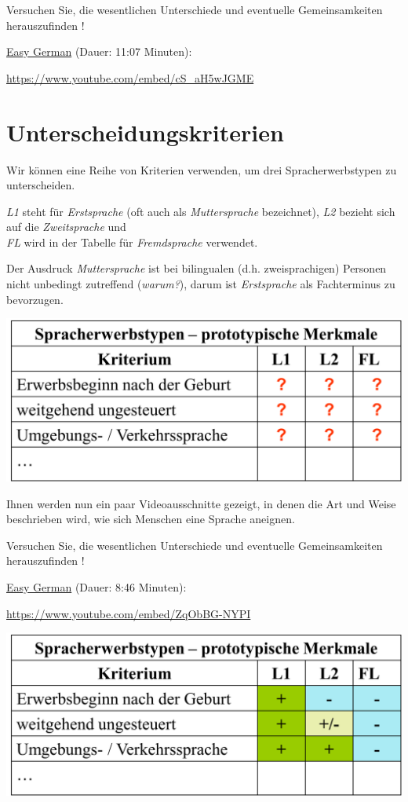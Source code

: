 \documentclass[
  letterpaper,
]{scrbook}
\begin{document}
Versuchen Sie, die wesentlichen Unterschiede und eventuelle
Gemeinsamkeiten herauszufinden !

\href{https://www.youtube.com/watch?v=cS_aH5wJGME}{Easy German} (Dauer:
11:07 Minuten):

\url{https://www.youtube.com/embed/cS_aH5wJGME}

\hypertarget{unterscheidungskriterien}{%
\section{Unterscheidungskriterien}\label{unterscheidungskriterien}}

Wir können eine Reihe von Kriterien verwenden, um drei
Spracherwerbstypen zu unterscheiden.

\emph{L1} steht für \emph{Erstsprache} (oft auch als
\emph{Muttersprache} bezeichnet), \emph{L2} bezieht sich auf die
\emph{Zweitsprache} und\\
\emph{FL} wird in der Tabelle für \emph{Fremdsprache} verwendet.

Der Ausdruck \emph{Muttersprache} ist bei bilingualen (d.h.
zweisprachigen) Personen nicht unbedingt zutreffend (\emph{warum?}),
darum ist \emph{Erstsprache} als Fachterminus zu bevorzugen.

\includegraphics[width=8.62in,height=\textheight]{./pictures/spracherwerbstypen.png}

Ihnen werden nun ein paar Videoausschnitte gezeigt, in denen die Art und
Weise beschrieben wird, wie sich Menschen eine Sprache aneignen.

Versuchen Sie, die wesentlichen Unterschiede und eventuelle
Gemeinsamkeiten herauszufinden !

\href{https://www.youtube.com/watch?v=ZqObBG-NYPI}{Easy German} (Dauer:
8:46 Minuten):

\url{https://www.youtube.com/embed/ZqObBG-NYPI}

\includegraphics[width=8.62in,height=\textheight]{./pictures/spracherwerbstypen2.png}
\end{document}

